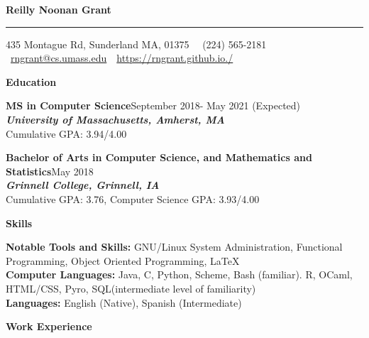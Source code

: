 \documentclass[9pt]{extarticle}
\begin{document}
\sffamily
\begin{huge}
\begin{center}
\textbf{Reilly Noonan Grant}
\end{center}
\end{huge}
\rule{19cm}{0.4pt}
\begin{center}
  435 Montague Rd, Sunderland MA, 01375 \,
\textbullet\, (224) 565-2181 \textbullet\ \href{mailto:rngrant@cs.umass.edu}{rngrant@cs.umass.edu} \,\textbullet\, \href{https://rngrant.github.io./}{https://rngrant.github.io./}
\end{center}

\begin{large}
\begin{center}\textbf{Education}
\end{center}
\end{large}

\textbf{MS in Computer Science}\hfill September 2018- May 2021 (Expected)\\
\textbf{\textit{University of Massachusetts, Amherst, MA}}\\
Cumulative GPA: 3.94/4.00

\textbf{Bachelor of Arts in Computer Science, and Mathematics and Statistics}\hfill May 2018\\
\textbf{\textit{Grinnell College, Grinnell, IA}}\\
Cumulative GPA: 3.76, Computer Science GPA: 3.93/4.00  \\

\begin{large}
\begin{center}\textbf{Skills}
\end{center}
\end{large}
\textbf{Notable Tools and Skills:} GNU/Linux System Administration,
Functional Programming, Object Oriented Programming, \LaTeX  \\
\textbf{Computer Languages: }Java, C, Python, Scheme, Bash
(familiar). R, OCaml, HTML/CSS, Pyro, SQL(intermediate level of familiarity)\\
\textbf{Languages:} English (Native), Spanish (Intermediate)


\begin{large}
\begin{center}\textbf{Work Experience}
\end{center}
\end{large}
\end{document}
